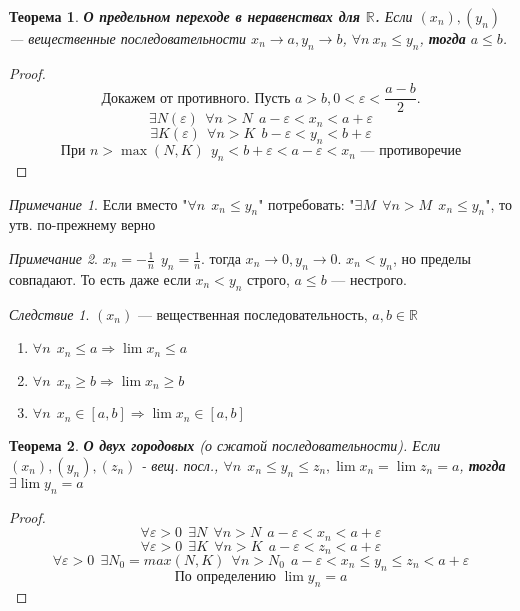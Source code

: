 \documentclass[12pt]{article}
\theoremstyle{plain}
\newtheorem{theorem}{Теорема}
\theoremstyle{remark}
\newtheorem*{remark}{Примечание}
\newtheorem*{consequence}{Следствие}
\theoremstyle{definition}
\begin{document}
\begin{theorem}
\textbf{О предельном переходе в неравенствах для $\mathbb{R}$.} Если $(x_n),(y_n)$ ---
вещественные последовательности $x_n\to a, y_n\to b$, $\forall n \ x_n\leq y_n$, \textbf{тогда} $a\leq b$.
\end{theorem}

\begin{proof}
$$\text{Докажем от противного. Пусть } a>b, 0<\varepsilon <\frac{a-b}{2}.$$
$$\exists N(\varepsilon) \ \ \forall n>N \ \ a-\varepsilon<x_n<a+\varepsilon$$
$$\exists K(\varepsilon) \ \ \forall n>K \ \ b-\varepsilon<y_n<b+\varepsilon $$
$$\text{При } n>\max(N,K) \ \ y_n < b + \varepsilon < a-\varepsilon <x_n \text{ --- противоречие}$$
\end{proof}

\begin{remark}
Если вместо "$\forall n \ \ x_n\leq y_n$" потребовать: "$\exists M \ \ \forall n>M \ \ x_n\leq y_n$", то утв. по-прежнему верно
\end{remark}

\begin{remark}
$x_n=-\frac{1}{n} \ \ y_n=\frac{1}{n}$. тогда $x_n\to 0, y_n\to 0$. $x_n<y_n$, но пределы совпадают. То есть даже если $x_n<y_n$ строго, $a\leq b$ --- нестрого.
\end{remark}

\begin{consequence}
$(x_n)$ --- вещественная последовательность, $a,b\in\mathbb{R}$
\begin{enumerate}
\item $\forall n \ \ x_n\leq a \Rightarrow \lim x_n\leq a$
\item $\forall n \ \ x_n\geq b \Rightarrow \lim x_n\geq b$
\item $\forall n \ \ x_n\in [a,b] \Rightarrow \lim x_n\in [a,b]$
\end{enumerate}
\end{consequence}

\begin{theorem}
\textbf{О двух городовых} (о сжатой последовательности). Если $(x_n),(y_n),(z_n)$ - вещ. посл., $\forall n \ \ x_n\leq y_n\leq z_n, \lim x_n=\lim z_n =a$, \textbf{тогда} $\exists \lim y_n=a$
\end{theorem}

\begin{proof}
$$\forall \varepsilon>0 \ \ \exists N \ \ \forall n>N \ \ a-\varepsilon<x_n<a+\varepsilon$$
$$\forall \varepsilon>0 \ \ \exists K \ \ \forall n>K \ \ a-\varepsilon<z_n<a+\varepsilon$$
$$\forall \varepsilon > 0 \ \ \exists N_0=max(N,K) \ \ \forall n>N_0 \ \ a-\varepsilon<x_n\leq y_n\leq z_n<a+\varepsilon$$
$$\text{По определению } \lim y_n=a$$
\end{proof}
\end{document}
